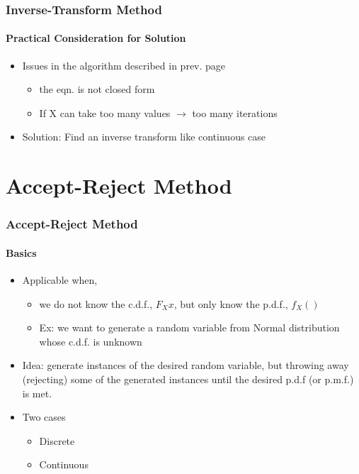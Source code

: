 \documentclass{beamer}
\begin{document}
\begin{frame}
    \frametitle{Inverse-Transform Method}
    \framesubtitle{Practical Consideration for Solution }
	\begin{itemize}
		\item Issues in the algorithm described in prev. page
		\begin{itemize}
		\item the eqn. is not closed form
		\item If X can take too many values $\rightarrow$ too many iterations
		\end{itemize}
		\item Solution: Find an inverse transform like continuous case
		
		  
	\end{itemize}	   
    
\end{frame}


\section{Accept-Reject Method}

\begin{frame}
    \frametitle{Accept-Reject Method}
    \framesubtitle{Basics }
	\begin{itemize}
		\item Applicable when, 
		\begin{itemize}
		\item we do not know the c.d.f., $F_X{x}$, but only know the p.d.f., 					$f_X ()$
		\item Ex: we want to generate a random variable from Normal 						distribution whose c.d.f. is unknown 

		\end{itemize}
		\item Idea: generate instances of the desired random variable, but throwing away (rejecting) some of the generated instances until the desired p.d.f (or p.m.f.) is met. 
		\item Two cases
		\begin{itemize}
		\item Discrete
		\item Continuous
		\end{itemize}
		  
	\end{itemize}	   
    
\end{frame}
\end{document}
